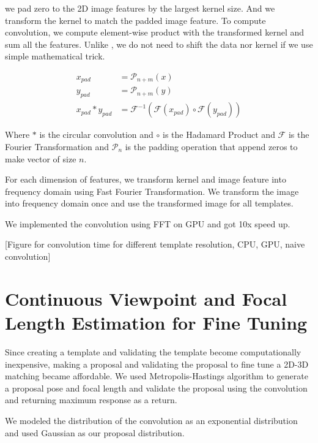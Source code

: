 \documentclass[10pt,twocolumn,letterpaper]{article}
\begin{document}
we pad zero to the 2D image features by the largest kernel size. And we transform the kernel to match the padded image feature. To compute convolution, we compute element-wise product with the transformed kernel and sum all the features. Unlike \cite{Podlozhnyuk}, we do not need to shift the data nor kernel if we use simple mathematical trick. 
  
\begin{align}
    x_{pad} & = \mathcal{P}_{n+m}(x)\\
    y_{pad} & = \mathcal{P}_{n+m}(y)\\
    x_{pad} \ast y_{pad} & = \mathcal{F}^{-1}(\mathcal{F}(x_{pad}) \circ \mathcal{F}(y_{pad}))
\end{align}

  Where $\ast$ is the circular convolution and $\circ$ is the Hadamard Product and $\mathcal{F}$ is the Fourier Transformation and $\mathcal{P}_n$ is the padding operation that append zeros to make vector of size $n$.

For each dimension of features, we transform kernel and image feature into frequency domain using Fast Fourier Transformation. We transform the image into frequency domain once and use the transformed image for all templates.

We implemented the convolution using FFT on GPU and got 10x speed up.

[Figure for convolution time for different template resolution, CPU, GPU, naive convolution]


\section{Continuous Viewpoint and Focal Length Estimation for Fine Tuning}
\label{sec:fine}

Since creating a template and validating the template become computationally inexpensive, making a proposal and validating the proposal to fine tune a 2D-3D matching became affordable. We used Metropolis-Hastings algorithm to generate a proposal pose and focal length and validate the proposal using the convolution and returning maximum response as a return.

We modeled the distribution of the convolution as an exponential distribution and used Gaussian as our proposal distribution.  
\end{document}
